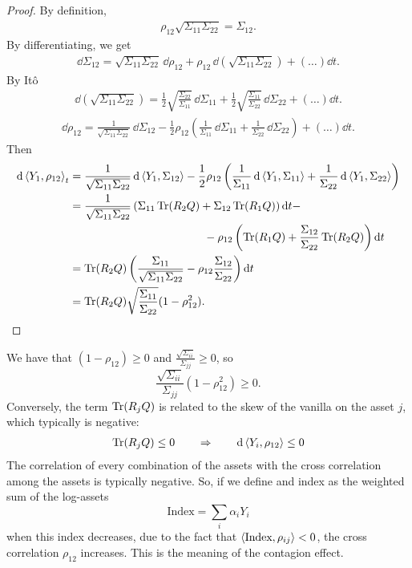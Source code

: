 \begin{proof}
    By definition,
    \begin{align*}
        \rho_{12}\sqrt{\Sigma_{11}\Sigma_{22}} = \Sigma_{12}.
    \end{align*}
    By differentiating, we get
    \begin{align*}
        \dd\Sigma_{12} = \sqrt{\Sigma_{11}\Sigma_{22}}\,\dd \rho_{12} + \rho_{12}\,\dd(\sqrt{\Sigma_{11}\Sigma_{22}}) + (\dots)\dd t.
    \end{align*}
    By Itô
    \begin{align*}
        \dd(\sqrt{\Sigma_{11}\Sigma_{22}}) = \frac{1}{2}\sqrt{\frac{\Sigma_{22}}{\Sigma_{11}}}\,\dd\Sigma_{11} + \frac{1}{2}\sqrt{\frac{\Sigma_{11}}{\Sigma_{22}}}\,\dd\Sigma_{22} + (\dots)\dd t.
    \end{align*}
    \begin{align*}
          \dd\rho_{12} = \frac{1}{\sqrt{\Sigma_{11}\Sigma_{22}}}\,\dd \Sigma_{12} - \frac{1}{2}\rho_{12}\left(
          \frac{1}{\Sigma_{11}}\,\dd\Sigma_{11} +
          \frac{1}{\Sigma_{22}}\,\dd\Sigma_{22}\right) + (\dots)\dd t.
    \end{align*}
    Then
    \begin{align*}
        \dd\expval{Y_1,\rho_{12}}_t &= \frac{1}{\sqrt{\Sigma_{11}\Sigma_{22}}}\,\dd\expval{Y_1,\Sigma_{12}} - \frac{1}{2}\rho_{12} \left(
        \frac{1}{\Sigma_{11}}\,\dd\expval{Y_1,\Sigma_{11}} + \frac{1}{\Sigma_{22}}\,\dd\expval{Y_1,\Sigma_{22}}
        \right) \\
        &=
        \frac{1}{\sqrt{\Sigma_{11}\Sigma_{22}}}\left(\Sigma_{11}\Tr(R_2Q)+\Sigma_{12}\Tr(R_1Q)\right)\dd t - \\
        &\qquad\qquad\qquad\qquad\qquad\qquad - \rho_{12}\left(\Tr(R_1Q) + \frac{\Sigma_{12}}{\Sigma_{22}}\Tr(R_2Q)\right)\dd t \\
        &=
        \Tr(R_2Q)\left(\frac{\Sigma_{11}}{\sqrt{\Sigma_{11}\Sigma_{22}}}-\rho_{12}\frac{\Sigma_{12}}{\Sigma_{22}}\right)\dd t \\
        &=
        \Tr(R_2Q)\sqrt{\frac{\Sigma_{11}}{\Sigma_{22}}}(1-\rho_{12}^2).
    \end{align*}
\end{proof}
We have that $(1-\rho_{12})\ge0$ and $\tfrac{\sqrt{\Sigma_{ii}}}{\Sigma_{jj}}\ge0$, so
\begin{equation*}
    \frac{\sqrt{\Sigma_{ii}}}{\Sigma_{jj}}(1-\rho_{12}^2) \ge 0.
\end{equation*}
Conversely, the term $\Tr(R_jQ)$ is related to the skew of the vanilla on the asset $j$, which typically is negative:
\begin{align*}
    \Tr(R_jQ) \le 0 \qquad\Rightarrow\qquad \dd\expval{Y_i,\rho_{12}} \le 0
\end{align*}
The correlation of every combination of the assets with the cross correlation among the assets is typically negative. So, if we define and index as the weighted sum of the log-assets
\begin{equation*}
    \text{Index} = \sum_i \alpha_iY_i
\end{equation*}
when this index decreases, due to the fact that $\expval{\text{Index},\rho_{ij}}<0$, the cross correlation $\rho_{12}$ increases. This is the meaning of the contagion effect.

